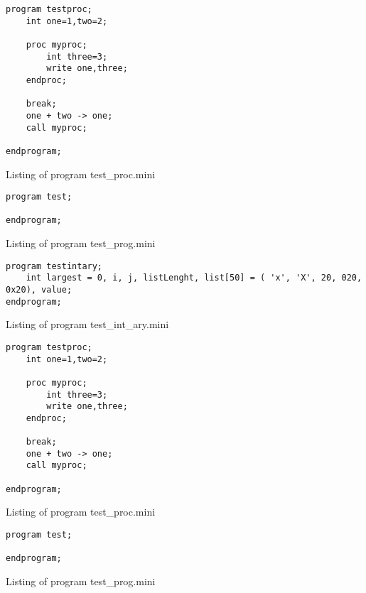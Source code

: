 \begin{program}
\begin{verbatim}
program testproc;
	int one=1,two=2;

	proc myproc;
		int three=3;
		write one,three;
	endproc;

	break;
	one + two -> one;
	call myproc;

endprogram;\end{verbatim}
\caption{Listing of program test\_proc.mini}
\end{program}

\begin{program}
\begin{verbatim}
program test;

endprogram;
\end{verbatim}
\caption{Listing of program test\_prog.mini}
\end{program}

\begin{program}
\begin{verbatim}
program testintary;
	int largest = 0, i, j, listLenght, list[50] = ( 'x', 'X', 20, 020, 0x20), value;
endprogram;
\end{verbatim}
\caption{Listing of program test\_int\_ary.mini}
\end{program}

\begin{program}
\begin{verbatim}
program testproc;
	int one=1,two=2;

	proc myproc;
		int three=3;
		write one,three;
	endproc;

	break;
	one + two -> one;
	call myproc;

endprogram;\end{verbatim}
\caption{Listing of program test\_proc.mini}
\end{program}

\begin{program}
\begin{verbatim}
program test;

endprogram;
\end{verbatim}
\caption{Listing of program test\_prog.mini}
\end{program}
